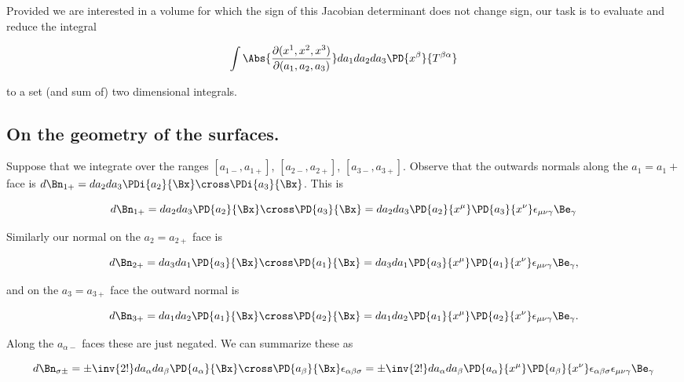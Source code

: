 Provided we are interested in a volume for which the sign of this Jacobian determinant does not change sign, our task is to evaluate and reduce the integral 

\begin{equation}\label{eqn:relativisticElectrodynamicsPS6:620}
\int 
\Abs{ \frac{\partial(x^1, x^2, x^3)}{\partial (a_1, a_2, a_3)}}
da_1 da_2 da_3 
\PD{x^\beta}{T^{\beta \alpha}}
\end{equation}

to a set (and sum of) two dimensional integrals.

\subsection{On the geometry of the surfaces.}

Suppose that we integrate over the ranges $[a_{1-}, a_{1+}]$, $[a_{2-}, a_{2+}]$, $[a_{3-}, a_{3+}]$.  Observe that the outwards normals along the $a_1 = a_1+$ face is $d\Bn_{1+} = da_2 da_3 \PDi{a_2}{\Bx} \cross \PDi{a_3}{\Bx}$.  This is

\begin{equation}\label{eqn:relativisticElectrodynamicsPS6:440}
d\Bn_{1+} 
= da_2 da_3 \PD{a_2}{\Bx} \cross \PD{a_3}{\Bx}
= da_2 da_3 \PD{a_2}{x^\mu} \PD{a_3}{x^\nu} \epsilon_{\mu \nu \gamma} \Be_\gamma
\end{equation}

Similarly our normal on the $a_2 = a_{2+}$ face is

\begin{equation}\label{eqn:relativisticElectrodynamicsPS6:460}
d\Bn_{2+} 
= da_3 da_1 \PD{a_3}{\Bx} \cross \PD{a_1}{\Bx}
= da_3 da_1 \PD{a_3}{x^\mu} \PD{a_1}{x^\nu} \epsilon_{\mu \nu \gamma} \Be_\gamma,
\end{equation}

and on the $a_3 = a_{3+}$ face the outward normal is

\begin{equation}\label{eqn:relativisticElectrodynamicsPS6:480}
d\Bn_{3+} 
= da_1 da_2 \PD{a_1}{\Bx} \cross \PD{a_2}{\Bx}
= da_1 da_2 \PD{a_1}{x^\mu} \PD{a_2}{x^\nu} \epsilon_{\mu \nu \gamma} \Be_\gamma.
\end{equation}

Along the $a_{\alpha-}$ faces these are just negated.  We can summarize these as

\begin{equation}\label{eqn:relativisticElectrodynamicsPS6:500}
d\Bn_{\sigma\pm} 
= \pm \inv{2!} da_\alpha da_\beta \PD{a_\alpha}{\Bx} \cross \PD{a_\beta}{\Bx} \epsilon_{\alpha \beta \sigma}
= \pm \inv{2!} da_\alpha da_\beta \PD{a_\alpha}{x^\mu} \PD{a_\beta}{x^\nu} \epsilon_{\alpha \beta \sigma} \epsilon_{\mu \nu \gamma} \Be_\gamma 
\end{equation}

